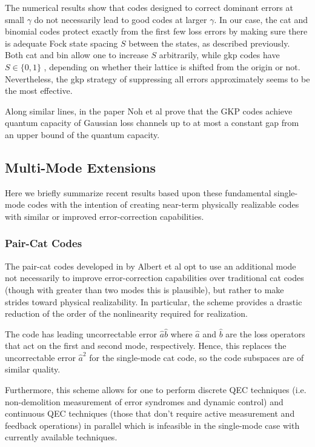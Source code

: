 \documentclass[12]{amsart}
\newcommand\0{\mathbf{0}}
\newcommand\<{\langle}
\renewcommand\>{\rangle}
\begin{document}
The numerical results show that codes designed to correct dominant errors at small $\gamma$ do not necessarily lead to good codes at larger $\gamma$. In our case, the cat and binomial codes protect exactly from the first few loss errors by making sure there is adequate Fock state spacing $S$ between the states, as described previously. Both cat and bin allow one to increase $S$ arbitrarily, while gkp codes have $S \in \{0, 1\}$ \cite{albert2017performance}, depending on whether their lattice is shifted from the origin or not. Nevertheless, the gkp strategy of suppressing all errors approximately seems to be the most effective.

Along similar lines, in the paper \cite{noh2018improved} Noh et al prove that the GKP codes achieve quantum capacity of Gaussian loss channels up to at most a constant gap from an upper bound of the quantum capacity.

\subsection{Multi-Mode Extensions}

Here we briefly summarize recent results based upon these fundamental single-mode codes with the intention of creating near-term physically realizable codes with similar or improved error-correction capabilities.

\subsubsection{Pair-Cat Codes}\label{sec:multi-cat}

The pair-cat codes developed in \cite{albert2018multimode} by Albert et al opt to use an additional mode not necessarily to improve error-correction capabilities over traditional cat codes (though with greater than two modes this is plausible), but rather to make strides toward physical realizability. In particular, the scheme provides a drastic reduction of the order of the nonlinearity required for realization. 

The code has leading uncorrectable error $\hat{a}\hat{b}$ where $\hat{a}$ and $\hat{b}$ are the loss operators that act on the first and second mode, respectively. Hence, this replaces the uncorrectable error $\hat{a}^2$ for the single-mode cat code, so the code subspaces are of similar quality.

Furthermore, this scheme allows for one to perform discrete QEC techniques (i.e. non-demolition measurement of error syndromes and dynamic control) and continuous QEC techniques (those that don't require active measurement and feedback operations) in parallel which is infeasible in the single-mode case with currently available techniques.
\end{document}
